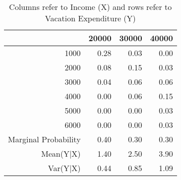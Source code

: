 \begin{table}[ht]
\centering
\caption*{Columns refer to Income (X) and rows refer to Vacation Expenditure (Y)}
\begin{tabular}{rrrr}
  \hline
 & 20000 & 30000 & 40000 \\ 
  \hline
1000 & 0.28 & 0.03 & 0.00 \\ 
  2000 & 0.08 & 0.15 & 0.03 \\ 
  3000 & 0.04 & 0.06 & 0.06 \\ 
  4000 & 0.00 & 0.06 & 0.15 \\ 
  5000 & 0.00 & 0.00 & 0.03 \\ 
  6000 & 0.00 & 0.00 & 0.03 \\ 
  Marginal Probability & 0.40 & 0.30 & 0.30 \\ 
  Mean(Y$|$X) & 1.40 & 2.50 & 3.90 \\ 
  Var(Y$|$X) & 0.44 & 0.85 & 1.09 \\ 
   \hline
\end{tabular}
\end{table}

